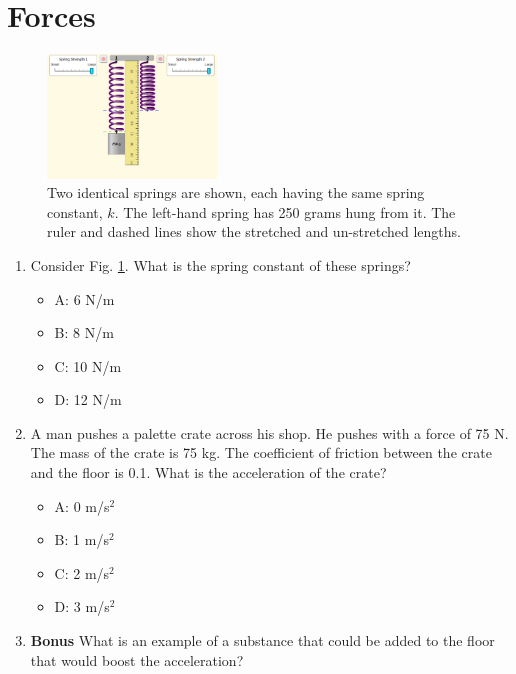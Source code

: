 \documentclass[10pt]{article}
\begin{document}
\section{Forces}
\begin{figure}
\centering
\includegraphics[width=0.4\textwidth,trim=0cm 2cm 0cm 0cm,clip=true]{force_midterm.png}
\caption{\label{fig:force} Two identical springs are shown, each having the same spring constant, $k$.  The left-hand spring has 250 grams hung from it.  The ruler and dashed lines show the stretched and un-stretched lengths.}
\end{figure}
\begin{enumerate}
\item Consider Fig. \ref{fig:force}.  What is the spring constant of these springs?
\begin{itemize}
\item A: 6 N/m
\item B: 8 N/m
\item C: 10 N/m
\item D: 12 N/m
\end{itemize}
\item A man pushes a palette crate across his shop.  He pushes with a force of 75 N.  The mass of the crate is 75 kg.  The coefficient of friction between the crate and the floor is 0.1.  What is the acceleration of the crate?
\begin{itemize}
\item A: 0 m/s$^2$
\item B: 1 m/s$^2$
\item C: 2 m/s$^2$
\item D: 3 m/s$^2$
\end{itemize}
\item \textbf{Bonus} What is an example of a substance that could be added to the floor that would boost the acceleration?
\end{enumerate}
\end{document}
